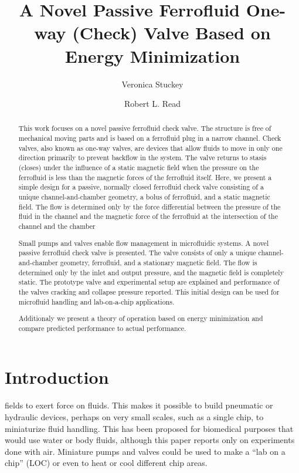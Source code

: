 \documentclass[]{asme2ej}
\title{A Novel Passive Ferrofluid One-way (Check) Valve Based on Energy Minimization}
\author{Veronica Stuckey
  \affiliation{
    Biomedical Engineer, University of Texas at Austin \\
    }
}
\author{Robert L. Read
\affiliation{
  Founder, Public Invention\\
    }
}
\begin{document}
\maketitle

\begin{abstract}

This work focuses on a novel passive ferrofluid check valve. The structure is free of mechanical moving parts and is based on a ferrofluid plug in a narrow channel.
Check valves, also known as one-way valves, are devices that allow fluids to move in only one direction primarily to prevent backflow in the system.
The valve returns to stasis (closes) under the influence of a static magnetic field when the pressure on the ferrofluid is less than the magnetic forces of the ferrofluid itself.
Here, we present a simple design for a passive, normally closed ferrofluid check valve consisting of a unique channel-and-chamber geometry, a bolus of ferrofluid, and a static magnetic field.
The flow is determined only by the force differential between the pressure of the fluid in the channel and the magnetic force of the ferrofluid at the intersection of the channel and the chamber

Small pumps and valves enable flow management in microfluidic systems.
A novel passive ferrofluid check valve is presented.
The valve consists of only a
unique channel-and-chamber geometry, ferrofluid, and a stationary
magnetic field.
The flow is determined only by the inlet and output pressure,
and the magnetic field is completely static.
The prototype valve and experimental setup are explained
and performance of the valves cracking and collapse pressure reported.
This initial design can be used for microfluid handling and lab-on-a-chip
applications.

Additionaly we present a theory of operation based on energy minimization
and compare predicted performance to actual performance.
\end{abstract}

\section{Introduction}


fields to exert force on fluids\cite{torres2014recent,kole2021engineering,ozbey2015modeling}.
This makes it possible to build pneumatic or hydraulic
devices, perhaps on very small scales,
such as a single chip\cite{yamahata2003ferrofluid,hatch2001ferrofluidic}, to
miniaturize fluid handling.
This has been proposed for biomedical purposes\cite{michelson2019novel}
that would use water or body fluids,
although this paper reports only on experiments done with air.
Miniature pumps and valves could be used to make a “lab on a chip” (LOC) or
even to heat or cool different chip areas.
\end{document}

